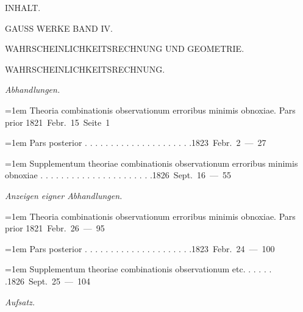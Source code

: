\clearpage
{}%
\begin{center}\Large INHALT.\par\bigskip GAUSS WERKE BAND IV.\par\medskip\large WAHRSCHEINLICHKEITSRECHNUNG UND GEOMETRIE.\end{center}
\begingroup\fontsize{10.5}{13}\selectfont{}
\par\medskip{}
\begin{center}WAHRSCHEINLICHKEITSRECHNUNG.\end{center}
\par\medskip{}
\noindent\textit{Abhandlungen.}\par
\par\noindent\hangindent=1em Theoria combinationis observationum erroribus minimis obnoxiae. Pars prior \hfill{}\hbox{}\nobreak\hfill\mbox{1821 Febr. 15 Seite 1}\par
\par\noindent\hangindent=1em Pars posterior . . . . . . . . . . . . . . . . . . . . .\hfill{}\hbox{}\nobreak\hfill\mbox{1823 Febr. 2 — 27}\par
\par\noindent\hangindent=1em Supplementum theoriae combinationis observationum erroribus minimis obnoxiae . . . . . . . . . . . . . . . . . . . . . .\hfill{}\hbox{}\nobreak\hfill\mbox{1826 Sept. 16 — 55}\par
\par\medskip{}
\noindent\textit{Anzeigen eigner Abhandlungen.}\par
\par\noindent\hangindent=1em Theoria combinationis observationum erroribus minimis obnoxiae. Pars prior \hfill{}\hbox{}\nobreak\hfill\mbox{1821 Febr. 26 — 95}\par
\par\noindent\hangindent=1em Pars posterior . . . . . . . . . . . . . . . . . . . . .\hfill{}\hbox{}\nobreak\hfill\mbox{1823 Febr. 24 — 100}\par
\par\noindent\hangindent=1em Supplementum theoriae combinationis observationum etc. . . . . . .\hfill{}\hbox{}\nobreak\hfill\mbox{1826 Sept. 25 — 104}\par
\par\medskip{}
\noindent\textit{Aufsatz.}\par
